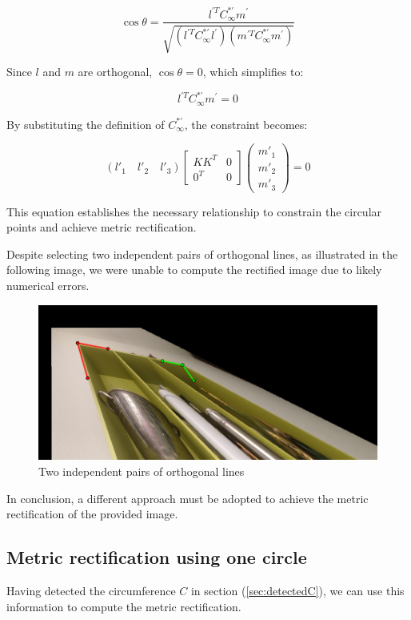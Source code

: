 \begin{equation}
    \cos\theta = \frac{l^{'T} C_\infty^{*'} m^{'}}{\sqrt{(l^{'T} C_\infty^{*'} l^{'}) (m^{'T} C_\infty^{*'} m^{'})}} \label{eq:1}
\end{equation}

Since $l$ and $m$ are orthogonal, $\cos \theta = 0$, which simplifies to:

\[
    l^{'T} C_\infty^{*'} m^{'} = 0
\]

By substituting the definition of $C_\infty^{*'}$, the constraint becomes:

\[
    (l'_1 \quad l'_2 \quad l'_3)
    \begin{bmatrix}
        KK^T & 0 \\
        0^T & 0
    \end{bmatrix}
    \begin{pmatrix}
        m'_1 \\
        m'_2 \\
        m'_3
    \end{pmatrix}
    = 0
\]

This equation establishes the necessary relationship to constrain the circular points and achieve metric rectification.

Despite selecting two independent pairs of orthogonal lines, as illustrated in the following image, we were unable to compute the rectified image due to likely numerical errors.


\begin{figure}[H]
    \centering
    \includegraphics[width=0.75\linewidth]{img/G2/tryMetric.jpg}
    \caption{Two independent pairs of orthogonal lines}
    \label{fig:twoPairsOfOrthogonalLines}
\end{figure}

In conclusion, a different approach must be adopted to achieve the metric rectification of the provided image.

\subsection{Metric rectification using one circle}
Having detected the circumference $C$ in section (\ref{sec:detectedC}), we can use this information to compute the metric rectification.

